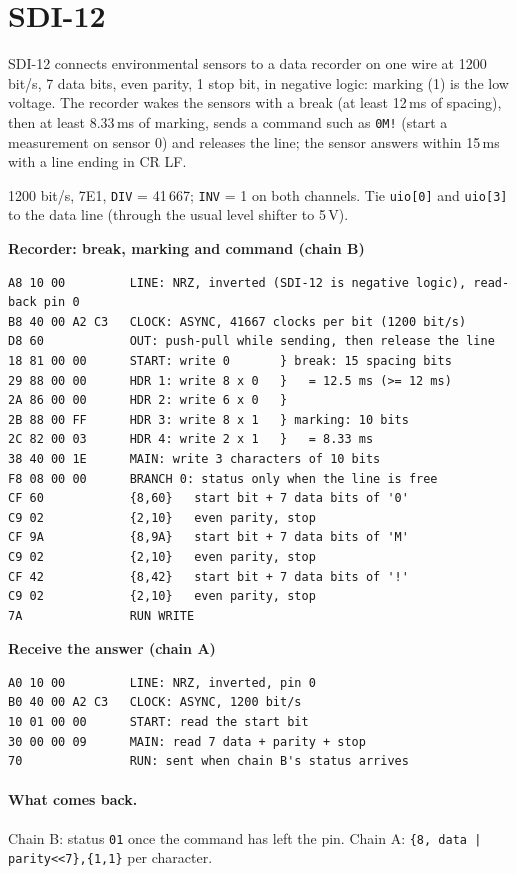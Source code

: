 \documentclass[11pt,a4paper]{article}
\newcommand{\sig}[1]{\texttt{#1}}
\newcommand{\progtitle}[1]{\par\smallskip\textbf{\small\color{accent}#1}\par\nopagebreak}
\newcommand{\facts}[1]{\par\noindent\colorbox{codebg}{\parbox{\dimexpr\linewidth-2\fboxsep}{\small #1}}\par}
\begin{document}
\section{SDI-12}
SDI-12 connects environmental sensors to a data recorder on one wire at 1200 bit/s, 7 data bits, even parity, 1 stop bit, in negative logic: marking (1) is the low voltage. The recorder wakes the sensors with a break (at least 12\,ms of spacing), then at least 8.33\,ms of marking, sends a command such as \texttt{0M!} (start a measurement on sensor 0) and releases the line; the sensor answers within 15\,ms with a line ending in CR LF.
\facts{1200 bit/s, 7E1, \sig{DIV} = 41\,667; \sig{INV} = 1 on both channels. Tie \sig{uio[0]} and \sig{uio[3]} to the data line (through the usual level shifter to 5\,V).}
\progtitle{Recorder: break, marking and command (chain B)}
\begin{lstlisting}
A8 10 00         LINE: NRZ, inverted (SDI-12 is negative logic), read-back pin 0
B8 40 00 A2 C3   CLOCK: ASYNC, 41667 clocks per bit (1200 bit/s)
D8 60            OUT: push-pull while sending, then release the line
18 81 00 00      START: write 0       } break: 15 spacing bits
29 88 00 00      HDR 1: write 8 x 0   }   = 12.5 ms (>= 12 ms)
2A 86 00 00      HDR 2: write 6 x 0   }
2B 88 00 FF      HDR 3: write 8 x 1   } marking: 10 bits
2C 82 00 03      HDR 4: write 2 x 1   }   = 8.33 ms
38 40 00 1E      MAIN: write 3 characters of 10 bits
F8 08 00 00      BRANCH 0: status only when the line is free
CF 60            {8,60}   start bit + 7 data bits of '0'
C9 02            {2,10}   even parity, stop
CF 9A            {8,9A}   start bit + 7 data bits of 'M'
C9 02            {2,10}   even parity, stop
CF 42            {8,42}   start bit + 7 data bits of '!'
C9 02            {2,10}   even parity, stop
7A               RUN WRITE
\end{lstlisting}
\progtitle{Receive the answer (chain A)}
\begin{lstlisting}
A0 10 00         LINE: NRZ, inverted, pin 0
B0 40 00 A2 C3   CLOCK: ASYNC, 1200 bit/s
10 01 00 00      START: read the start bit
30 00 00 09      MAIN: read 7 data + parity + stop
70               RUN: sent when chain B's status arrives
\end{lstlisting}
\paragraph{What comes back.} Chain B: status \texttt{01} once the command has left the pin. Chain A: \texttt{\{8, data | parity<<7\},\{1,1\}} per character.
\end{document}
